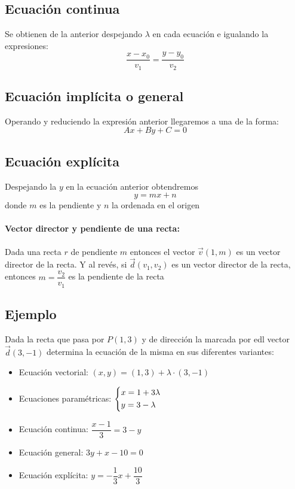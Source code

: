\documentclass[a4paper,spanish,9pt]{extarticle}
\begin{document}
\begin{multicols*}{2}
\subsection{Ecuación continua}
Se obtienen de la anterior despejando $\lambda$ en cada ecuación e igualando la expresiones:
$$ \dfrac{x-x_0}{v_1}=\dfrac{y-y_0}{v_2}$$

\subsection{Ecuación implícita o general}
Operando y reduciendo la expresión anterior llegaremos a una de la forma:
$$Ax+By+C=0$$

\subsection{Ecuación explícita}
Despejando la $y$ en la ecuación anterior obtendremos
$$y=mx+n$$
donde $m$ es la pendiente y $n$ la ordenada en el origen
\paragraph*{Vector director y pendiente de una recta:} 
Dada una recta $r$ de pendiente $m$ entonces el vector $\overrightarrow{v}(1,m)$ es un vector director de la recta. Y al revés, si $\overrightarrow{d}(v_1,v_2)$ es un vector director de la recta, entonces $m=\dfrac{v_2}{v_1}$ es la pendiente de la recta 

\subsection{Ejemplo}
Dada la recta que pasa por $P(1,3)$ y de dirección la marcada por edl vector $\overrightarrow{d}(3,-1)$ determina la ecuación de la misma en sus diferentes variantes:
\begin{itemize}
\item Ecuación vectorial:
$(x,y)=(1,3)+\lambda\cdot(3,-1)$
\item Ecuaciones paramétricas:
$\left\lbrace \begin{gathered}
  x = 1 + 3\lambda \hfill \\
  y = 3 - \lambda \hfill \\ 
\end{gathered}  \right.
$
\item Ecuación continua:
$\dfrac{x-1}{3}=3-y$
\item Ecuación general:
$3y+x-10=0$
\item Ecuación explícita:
$y=-\dfrac{1}{3}x+\dfrac{10}{3}$
\end{itemize}


\end{multicols*}
\end{document}
